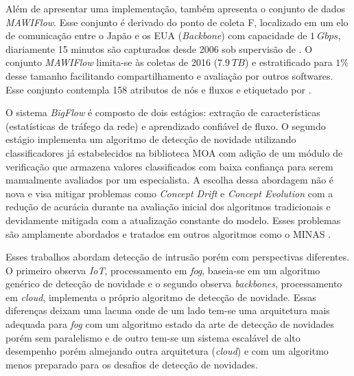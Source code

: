 Além de apresentar uma implementação,  também apresenta o
conjunto de dados \emph{MAWIFlow}. Esse conjunto é derivado do ponto de coleta
F, localizado em um elo de comunicação entre o Japão e os EUA (\emph{Backbone})
com capacidade de $1\ Gbps$, diariamente 15 minutos são capturados desde 2006
sob supervisão de  \cite{Fontugne2010}. O conjunto
\emph{MAWIFlow} limita-se às coletas de 2016 ($7.9\ TB$) e estratificado para
$1\%$ desse tamanho facilitando compartilhamento e avaliação por outros
softwares. Esse conjunto contempla 158 atributos de nós e fluxos e etiquetado
por .

O sistema \emph{BigFlow} é composto de dois estágios: extração de
características (estatísticas de tráfego da rede) e aprendizado confiável de
fluxo. O segundo estágio implementa um algoritmo de detecção de novidade
utilizando classificadores já estabelecidos na biblioteca MOA \cite{MOA} com
adição de um módulo de verificação que armazena valores classificados com baixa
confiança para serem manualmente avaliados por um especialista. A escolha dessa
abordagem não é nova e visa mitigar problemas como \emph{Concept Drift} e
\emph{Concept Evolution} \cite{Faria2016nd} com a redução de acurácia durante na
avaliação inicial dos algoritmos tradicionais e devidamente mitigada com a
atualização constante do modelo. Esses problemas são amplamente abordados e
tratados em outros algoritmos como o MINAS \cite{Faria2016minas}.

Esses trabalhos abordam detecção de intrusão porém com perspectivas diferentes.
O primeiro observa \emph{IoT}, processamento em \emph{fog}, baseia-se em um
algoritmo genérico de detecção de novidade e o segundo observa \emph{backbones},
processamento em \emph{cloud}, implementa o próprio algoritmo de detecção de
novidade. Essas diferenças deixam uma lacuna onde de um lado tem-se uma
arquitetura mais adequada para \emph{fog} com um algoritmo estado da arte de
detecção de novidades porém sem paralelismo e de outro tem-se um sistema
escalável de alto desempenho porém almejando outra arquitetura (\emph{cloud}) e
com um algoritmo menos preparado para os desafios de detecção de novidades.



